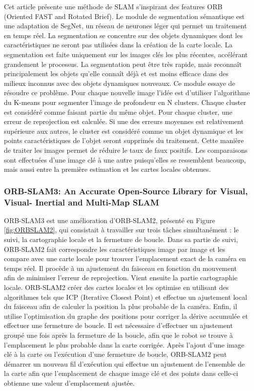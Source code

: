 \documentclass[11pt]{article}
\begin{document}
  Cet article présente une méthode de SLAM s'inspirant des features ORB (Oriented FAST and Rotated Brief).
  Le module de segmentation sémantique est une adaptation de SegNet, un réseau de neurones léger qui permet un traitement en temps réel.
  La segmentation se concentre sur des objets dynamiques dont les caractéristiques ne seront pas utilisées dans la création de 
  la carte locale. La segmentation est faite uniquement sur les images clés les plus récentes, accélérant grandement le processus.
  La segmentation peut être très rapide, mais reconnaît principalement les objets qu'elle connaît déjà et est moins efficace dans des 
  milieux inconnus avec des objets dynamiques nouveaux. Ce module essaye de résoudre ce problème.
  Pour chaque nouvelle image l'idée est d'utiliser l'algorithme du K-means pour segmenter l'image de profondeur en N clusters.
  Chaque cluster est considéré comme faisant partie du même objet. Pour chaque cluster, une erreur de reprojection est calculée. Si une 
  des erreurs moyennes est relativement supérieure aux autres, le cluster est considéré comme un objet dynamique et les points caractéristiques
  de l'objet seront supprimés du traitement. Cette manière de traiter les images permet de réduire le taux de faux positifs. 
  Les comparaisons sont effectuées d'une image clé à une autre puisqu'elles se ressemblent beaucoup, mais aussi entre la première estimation
  et les cartes locales obtenues.

  \pagebreak

  \subsubsection{ORB-SLAM3: An Accurate Open-Source Library for Visual, Visual-
  Inertial and Multi-Map SLAM}

  ORB-SLAM3 est une amélioration d'ORB-SLAM2, présenté en Figure \ref{fig:ORBSLAM2}, qui consistait à travailler sur trois tâches simultanément : le suivi, la cartographie locale 
  et la fermeture de boucle. Dans sa partie de suivi, ORB-SLAM2 fait correspondre les caractéristiques image par image et les compare avec une 
  carte locale pour trouver l'emplacement exact de la caméra en temps réel. Il procède à un ajustement du faisceau en fonction du mouvement 
  afin de minimiser l'erreur de reprojection. Vient ensuite la partie cartographie locale. ORB-SLAM2 créer des cartes locales et les optimise 
  en utilisant des algorithmes tels que ICP (Iterative Closest Point) et effectue un ajustement local du faisceau afin de calculer la position 
  la plus probable de la caméra. Enfin, il utilise l'optimisation du graphe des positions pour corriger la dérive accumulée et effectuer une 
  fermeture de boucle. Il est nécessaire d'effectuer un ajustement groupé une fois après la fermeture de la boucle, afin que le robot se trouve 
  à l'emplacement le plus probable dans la carte corrigée. Après l'ajout d'une image clé à la carte ou l'exécution d'une fermeture de boucle, 
  ORB-SLAM2 peut démarrer un nouveau fil d'exécution qui effectue un ajustement de l'ensemble de la carte afin que l'emplacement de chaque image 
  clé et des points dans celle-ci obtienne une valeur d'emplacement ajustée.
\end{document}
